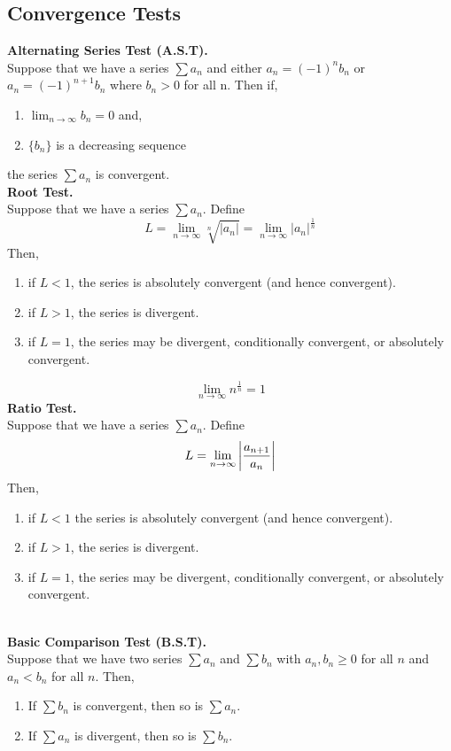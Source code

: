 \documentclass[11pt]{article}
\DeclarePairedDelimiter\abs{\lvert}{\rvert}
\begin{document}
\subsection{Convergence Tests}
\textbf{Alternating Series Test (A.S.T).} \\
Suppose that we have a series $\sum {a_n}$ and either $a_n = (-1)^nb_n$ or $a_n = (-1)^{n + 1}b_n$ where $b_n > 0$ for all n. Then if,
\begin{enumerate}[nolistsep]
\item $\lim_{n \to \infty} b_n = 0$ and,
\item$ \{b_n\}$ is a decreasing sequence
\end{enumerate}
the series $\sum a_n$ is convergent. \\
\newline
\textbf{Root Test.} \\
Suppose that we have a series $\sum {a_n}$. Define 
$$L = \lim_{n \to \infty} \sqrt[n]{|a_n|} = \lim_{n \to \infty} |a_n|^{\frac{1}{n}}$$
Then, 
\begin{enumerate}[nolistsep]
\item if $L < 1$, the series is absolutely convergent (and hence convergent). 
\item if $L > 1$, the series is divergent.  
\item if $L = 1$, the series may be divergent, conditionally convergent, or absolutely convergent. 
\end{enumerate} 
$$ \lim_{n \to \infty}n ^ {\frac{1}{n}} = 1$$ 
\textbf{Ratio Test.} \\
Suppose that we have a series $\sum {a_n}$. Define 
$$L = \lim_{n \to \infty} {\abs*{\frac{a_{n+1}}{a_n}}} $$
Then, 
\begin{enumerate}[nolistsep] 
\item if $L < 1$ the series is absolutely convergent (and hence convergent). 
\item if $L > 1$, the series is divergent.  
\item if $L = 1$, the series may be divergent, conditionally convergent, or absolutely convergent. 
\end{enumerate}
\  \\
\textbf{Basic Comparison Test (B.S.T).} \\
Suppose that we have two series $\sum {a_n}$ and $\sum {b_n}$ with $a_n, b_n \geqslant 0$ for all $n$ and $a_n < b_n$ for all $n$. Then, 
\begin{enumerate}
\item If $\sum{b_n}$ is convergent, then so is $\sum a_n$. 
\item If $\sum{a_n}$ is divergent, then so is $\sum b_n$.
\end{enumerate}
\end{document}
